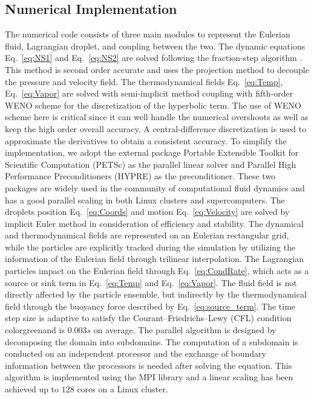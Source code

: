 \documentclass[draft,linenumbers]{agujournal}
\newcommand{\Eq}[1]{Eq.~\eqref{#1}}
\begin{document}
\subsection{Numerical Implementation}
The numerical code consists of three main modules to represent the Eulerian fluid, Lagrangian droplet, and coupling between the two. The dynamic equations \Eq{eq:NS1} and \Eq{eq:NS2} are solved following the fraction-step algorithm \citep{Brown2001}. {This method is second order accurate and uses the projection method to decouple the pressure and velocity field.} The thermodynamical fields \Eq{eq:Temp}, \Eq{eq:Vapor} are solved with semi-implicit method coupling with fifth-order WENO scheme for the discretization of the hyperbolic term. The use of WENO scheme here is critical since it can well handle the numerical overshoots as well as keep the high order overall accuracy. {A central-difference discretization is used to approximate the derivatives to obtain a consistent accuracy.} To simplify the implementation, we adopt the external package Portable Extensible Toolkit for Scientific Computation (PETSc) \citep{petsc_cite} as the parallel linear solver and Parallel High Performance Preconditioners (HYPRE) \citep{hypre_cite} as the preconditioner. These two packages are widely used in the community of computational fluid dynamics and has a good parallel scaling in both Linux clusters and supercomputers. The droplets position \Eq{eq:Coords} and motion \Eq{eq:Velocity} are solved by implicit Euler method in consideration of efficiency and stability. The dynamical and thermodynamical fields are represented on an Eulerian rectangular grid, while the particles are explicitly tracked during the simulation by utilizing the information of the Eulerian field through {trilinear} interpolation. The Lagrangian particles impact on the Eulerian field through \Eq{eq:CondRate}, which acts as a source or sink term in \Eq{eq:Temp} and \Eq{eq:Vapor}. The fluid field is not directly affected by the particle ensemble, but indirectly by the thermodynamical field through the buoyancy force described by \Eq{eq:source_term}. The time step size is adaptive to satisfy the Courant--Friedrichs--Lewy (CFL) condition {color{green}and is $0.003s$ on average}. {The parallel algorithm is designed by decomposing the domain into subdomains. The computation of a subdomain is conducted on an independent processor and the exchange of boundary information between the processors is needed after solving the equation. This algorithm is implemented using the MPI library and a linear scaling has been achieved up to $128$ cores on a Linux cluster.}
\end{document}
